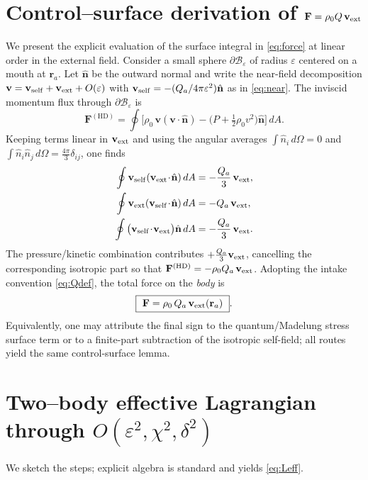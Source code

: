 \documentclass[11pt]{article}
\numberwithin{equation}{section}
\theoremstyle{plain}
\theoremstyle{remark}
\theoremstyle{definition}
\begin{document}
\section{Control–surface derivation of $\mathbf F=\rho_0 Q\,\mathbf v_{\rm ext}$}
\label{app:flux}
We present the explicit evaluation of the surface integral in \eqref{eq:force} at linear order in the external field.
Consider a small sphere $\partial\mathcal B_\varepsilon$ of radius $\varepsilon$ centered on a mouth at $\mathbf r_a$.
Let $\hat{\mathbf n}$ be the outward normal and write the near-field decomposition
$\mathbf v=\mathbf v_{\rm self}+\mathbf v_{\rm ext}+O(\varepsilon)$ with
$\mathbf v_{\rm self}=-(Q_a/4\pi\varepsilon^2)\hat{\mathbf n}$ as in \eqref{eq:near}.
The inviscid momentum flux through $\partial\mathcal B_\varepsilon$ is
\begin{equation}
\mathbf F^{(\mathrm{HD})}
=\oint \Big[\rho_0\,\mathbf v(\mathbf v\!\cdot\!\hat{\mathbf n})
-\big(P+\tfrac12\rho_0 v^2\big)\hat{\mathbf n}\Big]\,dA.
\end{equation}
Keeping terms linear in $\mathbf v_{\rm ext}$ and using the angular averages
$\int \hat n_i\,d\Omega=0$ and $\int \hat n_i \hat n_j\,d\Omega=\tfrac{4\pi}{3}\delta_{ij}$, one finds
\begin{align}
\oint \mathbf v_{\rm self}(\mathbf v_{\rm ext}\!\cdot\!\hat{\mathbf n})\,dA &= -\frac{Q_a}{3}\,\mathbf v_{\rm ext},\\
\oint \mathbf v_{\rm ext}(\mathbf v_{\rm self}\!\cdot\!\hat{\mathbf n})\,dA &= -Q_a\,\mathbf v_{\rm ext},\\
\oint \big(\mathbf v_{\rm self}\!\cdot\!\mathbf v_{\rm ext}\big)\hat{\mathbf n}\,dA &= -\frac{Q_a}{3}\,\mathbf v_{\rm ext}.
\end{align}
The pressure/kinetic combination contributes $+\tfrac{Q_a}{3}\mathbf v_{\rm ext}$, cancelling the corresponding isotropic part so that
$\mathbf F^{(\mathrm{HD})}=-\rho_0 Q_a\,\mathbf v_{\rm ext}$.
Adopting the intake convention \eqref{eq:Qdef}, the total force on the \emph{body} is
\begin{equation}
\boxed{\ \mathbf F=\rho_0\,Q_a\,\mathbf v_{\rm ext}(\mathbf r_a)\ }.
\end{equation}
Equivalently, one may attribute the final sign to the quantum/Madelung stress surface term or to a finite-part subtraction of the isotropic self-field; all routes yield the same control-surface lemma.

\section{Two–body effective Lagrangian through $O(\varepsilon^2,\chi^2,\delta^2)$}
\label{app:lagrangian}
We sketch the steps; explicit algebra is standard and yields \eqref{eq:Leff}.
\end{document}
